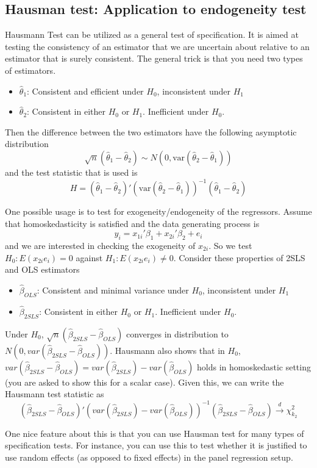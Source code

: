 \documentclass[12pt]{article}
\theoremstyle{definition}
\theoremstyle{property}
\theoremstyle{assumption}
\theoremstyle{example}
\theoremstyle{comment}
\begin{document}
\subsection{Hausman test: Application to endogeneity test}
Hausmann Test can be utilized as a general test of specification. It is aimed at testing the consistency of an estimator that we are uncertain about relative to an estimator that is surely consistent. The general trick is that you need two types of estimators. 
\begin{itemize}
\item $\hat{\theta}_1$: Consistent and efficient under $H_0$, inconsistent under $H_1$
\item $\hat{\theta}_2$: Consistent in either $H_0$ or $H_1$. Inefficient under $H_0$. 
\end{itemize}
Then the difference between the two estimators have the following asymptotic distribution
\[
\sqrt{n}(\hat{\theta}_1-\hat{\theta}_2) \sim N(0, \text{var}(\hat{\theta}_2-\hat{\theta}_1))
\]
and the test statistic that is used is
\[
H=(\hat{\theta}_1-\hat{\theta}_2)'(\text{var}(\hat{\theta}_2-\hat{\theta}_1))^{-1}(\hat{\theta}_1-\hat{\theta}_2)
\] \par
One possible usage is to test for exogeneity/endogeneity of the regressors. Assume that homoskedasticity is satisfied and the data generating process is
\[
y_i = x_{1i}'\beta_1 + x_{2i}'\beta_2+e_i
\]
and we are interested in checking the exogeneity of $x_{2i}$. So we test $H_0: E(x_{2i}e_i)=0$ against $H_1:E(x_{2i}e_i)\neq0$. Consider these properties of 2SLS and OLS estimators
\begin{itemize}
\item $\hat{\beta}_{OLS}$: Consistent and minimal variance under $H_0$, inconsistent under $H_1$
\item $\hat{\beta}_{2SLS}$:  Consistent in either $H_0$ or $H_1$. Inefficient under $H_0$. 
\end{itemize}
Under $H_0$, $\sqrt{n}(\hat{\beta}_{2SLS}-\hat{\beta}_{OLS})$ converges in distribution to $N(0, var(\hat{\beta}_{2SLS}-\hat{\beta}_{OLS}))$. Hausmann also shows that in $H_0$, $var(\hat{\beta}_{2SLS}-\hat{\beta}_{OLS})=var(\hat{\beta}_{2SLS})-var(\hat{\beta}_{OLS})$ holds in homoskedastic setting (you are asked to show this for a scalar case). Given this, we can write the Hausmann test statistic as 
\[
(\hat{\beta}_{2SLS}-\hat{\beta}_{OLS})'(var(\hat{\beta}_{2SLS})-var(\hat{\beta}_{OLS}))^{-1}(\hat{\beta}_{2SLS}-\hat{\beta}_{OLS})\xrightarrow{d}\chi_{k_2}^2
\]\par
One nice feature about this is that you can use Hausman test for many types of specification tests. For instance, you can use this to test whether it is justified to use random effects (as opposed to fixed effects) in the panel regression setup. 
\end{document}
